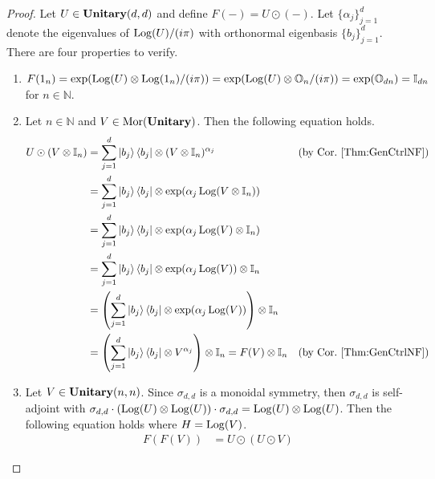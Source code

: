 \begin{proof}
    Let $U \in \mathbf{Unitary}( d, d )$ and define $F( - ) = U \odot ( - )$.
    Let $\{ \alpha_j \}_{j=1}^d$ denote the eigenvalues of $\operatorname{Log}( U ) / (i\pi)$ with orthonormal eigenbasis $\{ b_j \}_{j=1}^d$.
    There are four properties to verify.
    \begin{enumerate}
    \item $F( 1_n ) = \exp( \operatorname{Log}( U ) \otimes \operatorname{Log}( 1_n ) / ( i\pi ) ) = \exp( \operatorname{Log}( U ) \otimes \mathbb{O}_n / ( i\pi ) ) = \exp( \mathbb{O}_{dn} ) = \mathbb{I}_{dn}$ for $n \in \mathbb{N}$.
    \item Let $n \in \mathbb{N}$ and $V \in \operatorname{Mor}( \mathbf{Unitary} )$.
          Then the following equation holds.
          \begin{align*}
              U \odot ( V \otimes \mathbb{I}_n )
              &=
              \sum_{j=1}^d \ket{b_j} \bra{b_j} \otimes ( V \otimes \mathbb{I}_n )^{\alpha_j}
              &
              ( \text{by Cor.~\ref{Thm:GenCtrlNF}} )
              \\
              &=
              \sum_{j=1}^d \ket{b_j} \bra{b_j} \otimes \exp( \alpha_j \operatorname{Log}( V \otimes \mathbb{I}_n ) )
              \\
              &=
              \sum_{j=1}^d \ket{b_j} \bra{b_j} \otimes \exp( \alpha_j \operatorname{Log}( V ) \otimes \mathbb{I}_n )
              \\
              &=
              \sum_{j=1}^d \ket{b_j} \bra{b_j} \otimes \exp( \alpha_j \operatorname{Log}( V ) ) \otimes \mathbb{I}_n
              \\
              &=
              \left( \sum_{j=1}^d \ket{b_j} \bra{b_j} \otimes \exp( \alpha_j \operatorname{Log}( V ) ) \right) \otimes \mathbb{I}_n
              \\
              &=
              \left( \sum_{j=1}^d \ket{b_j} \bra{b_j} \otimes V^{\alpha_j} \right) \otimes \mathbb{I}_n
              =
              F( V ) \otimes \mathbb{I}_n
              &
              ( \text{by Cor.~\ref{Thm:GenCtrlNF}} )
          \end{align*}
    \item Let $V \in \mathbf{Unitary}( n, n )$.
          Since $\sigma_{d,d}$ is a monoidal symmetry, then $\sigma_{d,d}$ is self-adjoint with $\sigma_{d,d} \cdot ( \operatorname{Log}( U ) \otimes \operatorname{Log}( U ) ) \cdot \sigma_{d,d} = \operatorname{Log}( U ) \otimes \operatorname{Log}( U )$.
          Then the following equation holds where $H = \operatorname{Log}( V )$.
          \begin{align*}
              F( F( V ) )
              &=
              U \odot ( U \odot V )

\end{align*}
\end{enumerate}
\end{proof}
